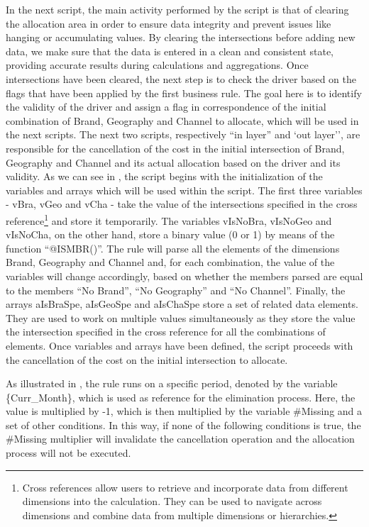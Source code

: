 \documentclass[12pt,a4paper,openright,twoside]{book}
\begin{document}
In the next script, the main activity performed by the script is that of clearing the allocation area in order to ensure data integrity and prevent issues like hanging or accumulating values.
%
By clearing the intersections before adding new data, we make sure that the data is entered in a clean and consistent state, providing accurate results during calculations and aggregations.
%
Once intersections have been cleared, the next step is to check the driver based on the flags that have been applied by the first business rule.
%
The goal here is to identify the validity of the driver and assign a flag in correspondence of the initial combination of Brand, Geography and Channel to allocate, which will be used in the next scripts.
%
The next two scripts, respectively ``in layer'' and `out layer'', are responsible for the cancellation of the cost in the initial intersection of Brand, Geography and Channel and its actual allocation based on the driver and its validity.
%
As we can see in , the script begins with the initialization of the variables and arrays which will be used within the script.
%
The first three variables - vBra, vGeo and vCha - take the value of the intersections specified in the cross reference\footnote{Cross references allow users to retrieve and incorporate data from different dimensions into the calculation. They can be used to navigate across dimensions and combine data from multiple dimensions or hierarchies.} and store it temporarily.
%
The variables vIsNoBra, vIsNoGeo and vIsNoCha, on the other hand, store a binary value (0 or 1) by means of the function ``@ISMBR()''.
%
The rule will parse all the elements of the dimensions Brand, Geography and Channel and,  for each combination, the value of the variables will change accordingly, based on whether the members parsed are equal to the members ``No Brand'', ``No Geography'' and ``No Channel''.
%
Finally, the arrays aIsBraSpe, aIsGeoSpe and aIsChaSpe store a set of related data elements.
%
They are used to work on multiple values simultaneously as they store the value the intersection specified in the cross reference for all the combinations of elements.
%
Once variables and arrays have been defined, the script proceeds with the cancellation of the cost on the initial intersection to allocate.



As illustrated in , the rule runs on a specific period, denoted by the variable \{Curr\_Month\}, which is used as reference for the elimination process.
%
Here, the value is multiplied by -1, which is then multiplied by the variable \#Missing and a set of other conditions.
%
In this way, if none of the following conditions is true, the \#Missing multiplier will invalidate the cancellation operation and the allocation process will not be executed.
\end{document}
